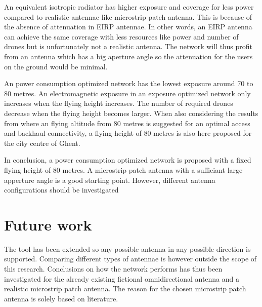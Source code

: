 An equivalent isotropic radiator has higher exposure and coverage for less power compared to realistic antennae like microstrip patch antenna.
This is because  of the absence of attenuation in \gls{EIRP} antennae. In other words, an \gls{EIRP} antenna can achieve the same coverage with less
resources like power and number of drones but is unfortunately not a realistic antenna. The network will thus profit from an antenna which has a big 
aperture angle so the attenuation for the users on the ground would be minimal.


An power consumption optimized network has the lowest exposure around 70 to 80 metres. An electromagnetic exposure in an 
exposure optimized network only increases when the flying height increases. The number of required drones decrease 
when the flying height becomes larger. When also considering the results from \cite{J27_backhaul} where an flying altitude from 
80 metres is suggested for an optimal access and backhaul connectivity, a flying height 
of 80 metres is also here proposed for the city centre of Ghent.

In conclusion, a power consumption optimized network is proposed with a fixed flying height of 80 metres. A microstrip patch 
antenna with a sufficiant large apperture angle is a good starting point. However, different antenna configurations should 
be investigated 

\section{Future work}
The tool has been extended so any possible antenna in any possible direction is supported. Comparing different types 
of antennae is however outside the scope of this research.
Conclusions on how the network performs has thus been investigated for the already existing fictional omnidirectional antenna and a 
realistic microstrip patch antenna. The reason for the chosen microstrip patch antenna is solely based on literature.

